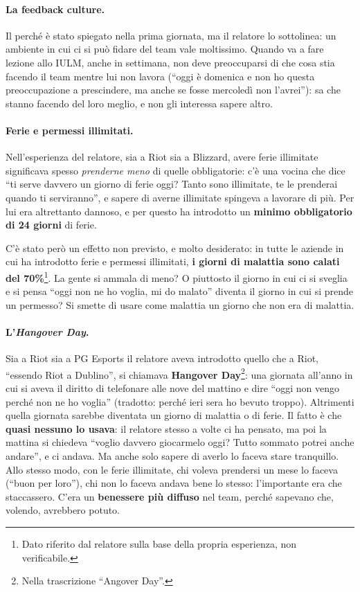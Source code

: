 \paragraph{La feedback culture.} Il perché è stato spiegato nella prima giornata, ma
il relatore lo sottolinea: un ambiente in cui ci si può fidare del team vale
moltissimo. Quando va a fare lezione allo IULM, anche in settimana, non deve
preoccuparsi di che cosa stia facendo il team mentre lui non lavora (``oggi è
domenica e non ho questa preoccupazione a prescindere, ma anche se fosse mercoledì
non l'avrei''): sa che stanno facendo del loro meglio, e non gli interessa sapere
altro.

\paragraph{Ferie e permessi illimitati.} Nell'esperienza del relatore, sia a Riot sia
a Blizzard, avere ferie illimitate significava spesso \emph{prenderne meno} di quelle
obbligatorie: c'è una vocina che dice ``ti serve davvero un giorno di ferie oggi?
Tanto sono illimitate, te le prenderai quando ti serviranno'', e sapere di averne
illimitate spingeva a lavorare di più. Per lui era altrettanto dannoso, e per questo
ha introdotto un \textbf{minimo obbligatorio di 24 giorni} di ferie.

C'è stato però un effetto non previsto, e molto desiderato: in tutte le aziende in
cui ha introdotto ferie e permessi illimitati, \textbf{i giorni di malattia sono
calati del 70\%}\footnote{Dato riferito dal relatore sulla base della propria
esperienza, non verificabile.}. La gente si ammala di meno? O piuttosto il giorno in
cui ci si sveglia e si pensa ``oggi non ne ho voglia, mi do malato'' diventa il
giorno in cui si prende un permesso? Si smette di usare come malattia un giorno che
non era di malattia.

\paragraph{L'\emph{Hangover Day}.} Sia a Riot sia a PG Esports il relatore aveva
introdotto quello che a Riot, ``essendo Riot a Dublino'', si chiamava
\textbf{Hangover Day}\footnote{Nella trascrizione ``Angover Day''.}: una giornata
all'anno in cui si aveva il diritto di telefonare alle nove del mattino e dire ``oggi
non vengo perché non ne ho voglia'' (tradotto: perché ieri sera ho bevuto troppo).
Altrimenti quella giornata sarebbe diventata un giorno di malattia o di ferie. Il
fatto è che \textbf{quasi nessuno lo usava}: il relatore stesso a volte ci ha
pensato, ma poi la mattina si chiedeva ``voglio davvero giocarmelo oggi? Tutto
sommato potrei anche andare'', e ci andava. Ma anche solo sapere di averlo lo faceva
stare tranquillo. Allo stesso modo, con le ferie illimitate, chi voleva prendersi un
mese lo faceva (``buon per loro''), chi non lo faceva andava bene lo stesso:
l'importante era che staccassero. C'era un \textbf{benessere più diffuso} nel team,
perché sapevano che, volendo, avrebbero potuto.

